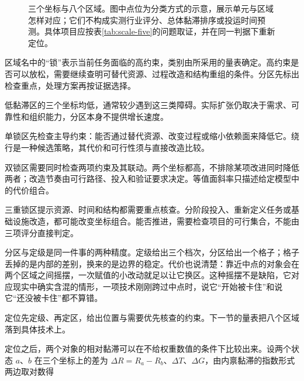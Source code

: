 \begin{figure}[ht]
{

}
\caption{三个坐标与八个区域。图中点位为分类方式的示意，展示单元与区域怎样对应；它们不构成实测行业评分、总体黏滞排序或投运时间预测。具体项目应按表\ref{tab:scale-five}的问题取证，并在同一判据下重新定位。}
\label{fig:rtg-octant}
\end{figure}

区域名中的“锁”表示当前任务面临的高约束，类别由所采用的量表确定。高约束是否可以放松，需要继续查明可替代资源、过程改造和结构重组的条件。分区先标出检查重点，处理方案再按证据选择。

低黏滞区的三个坐标均低，通常较少遇到这三类障碍。实际扩张仍取决于需求、可靠性和组织能力，分区本身不提供增长速度。

单锁区先检查主导约束：能否通过替代资源、改变过程或缩小依赖面来降低它。绕行是一种候选策略，其代价和可行性须与直接改造比较。

双锁区需要同时检查两项约束及其联动。两个坐标都高，不排除某项改进同时降低两者；改造节奏由可行路径、投入和验证要求决定。等值面斜率只描述给定模型中的代价组合。

三重锁区提示资源、时间和结构都需要重点核查。分阶段投入、重新定义任务或基础设施改造，都可能改变坐标组合。能否推进，需要检查项目的可行集合，不能由三项评分直接判定。

分区与定级是同一件事的两种精度。定级给出三个档次，分区给出一个格子；格子丢掉的是内部的差别，换来的是边界的稳定。代价也说清楚：靠近中点的对象会在两个区域之间摇摆，一次赋值的小改动就足以让它换区。这种摇摆不是缺陷，它对应现实中确实含混的情形，一项技术刚刚跨过中点时，说它“开始被卡住”和说它“还没被卡住”都不算错。

定位先定级、再定区，给出位置与需要优先核查的约束。下一节的量表把八个区域落到具体技术上。


定位之后，两个对象的相对黏滞可以在不给权重数值的条件下比较出来。设两个状态 $a$、$b$ 在三个坐标上的差为 $\Delta R=R_{a}-R_{b}$、$\Delta T$、$\Delta G$，由内禀黏滞的指数形式两边取对数得


